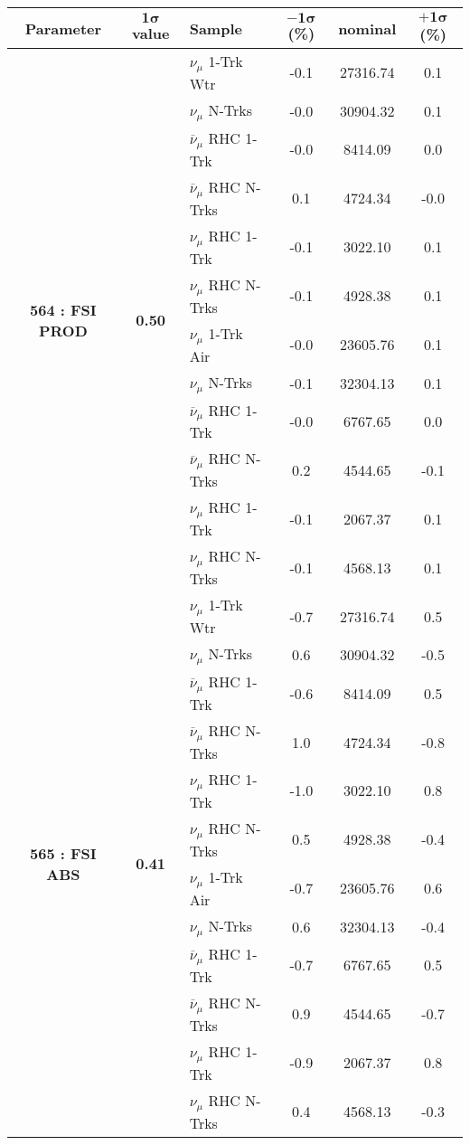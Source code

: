 \addtocounter{table}{-1}
\newpage
\begin{table}[ht!]
\centering

\begin{tabular}{ c  c  l  c  c  c }
\midrule[1.3pt]
\textbf{Parameter} & \textbf{$\mathbf{1\sigma}$ value} & \textbf{Sample} & \textbf{$\mathbf{-1\sigma}$ (\%)}  &  \textbf{nominal}  &  \textbf{$\mathbf{+1\sigma}$ (\%)} \\
\midrule[1.3pt]
\multirow{12}{*}{\textbf{564 : FSI PROD}} & \multirow{12}{*}{\textbf{0.50}} & $\nu_\mu$ 1-Trk Wtr &   -0.1 &  27316.74 &   0.1 \\ 
 &  & $\nu_\mu$ N-Trks &   -0.0 &  30904.32 &   0.1 \\ 
 &  & $\overline{\nu}_\mu$ RHC 1-Trk &   -0.0 &  8414.09 &   0.0 \\ 
 &  & $\overline{\nu}_\mu$ RHC N-Trks &   0.1 &  4724.34 &   -0.0 \\ 
 &  & $\nu_\mu$ RHC 1-Trk &   -0.1 &  3022.10 &   0.1 \\ 
 &  & $\nu_\mu$ RHC N-Trks &   -0.1 &  4928.38 &   0.1 \\ 
 &  & $\nu_\mu$ 1-Trk Air &   -0.0 &  23605.76 &   0.1 \\ 
 &  & $\nu_\mu$ N-Trks &   -0.1 &  32304.13 &   0.1 \\ 
 &  & $\overline{\nu}_\mu$ RHC 1-Trk &   -0.0 &  6767.65 &   0.0 \\ 
 &  & $\overline{\nu}_\mu$ RHC N-Trks &   0.2 &  4544.65 &   -0.1 \\ 
 &  & $\nu_\mu$ RHC 1-Trk &   -0.1 &  2067.37 &   0.1 \\ 
 &  & $\nu_\mu$ RHC N-Trks &   -0.1 &  4568.13 &   0.1 \\ 
\midrule[1.3pt]
\multirow{12}{*}{\textbf{565 : FSI ABS}} & \multirow{12}{*}{\textbf{0.41}} & $\nu_\mu$ 1-Trk Wtr &   -0.7 &  27316.74 &   0.5 \\ 
 &  & $\nu_\mu$ N-Trks &   0.6 &  30904.32 &   -0.5 \\ 
 &  & $\overline{\nu}_\mu$ RHC 1-Trk &   -0.6 &  8414.09 &   0.5 \\ 
 &  & $\overline{\nu}_\mu$ RHC N-Trks &   1.0 &  4724.34 &   -0.8 \\ 
 &  & $\nu_\mu$ RHC 1-Trk &   -1.0 &  3022.10 &   0.8 \\ 
 &  & $\nu_\mu$ RHC N-Trks &   0.5 &  4928.38 &   -0.4 \\ 
 &  & $\nu_\mu$ 1-Trk Air &   -0.7 &  23605.76 &   0.6 \\ 
 &  & $\nu_\mu$ N-Trks &   0.6 &  32304.13 &   -0.4 \\ 
 &  & $\overline{\nu}_\mu$ RHC 1-Trk &   -0.7 &  6767.65 &   0.5 \\ 
 &  & $\overline{\nu}_\mu$ RHC N-Trks &   0.9 &  4544.65 &   -0.7 \\ 
 &  & $\nu_\mu$ RHC 1-Trk &   -0.9 &  2067.37 &   0.8 \\ 
 &  & $\nu_\mu$ RHC N-Trks &   0.4 &  4568.13 &   -0.3 \\ 
\midrule[1.3pt]
\end{tabular}
\end{table}
